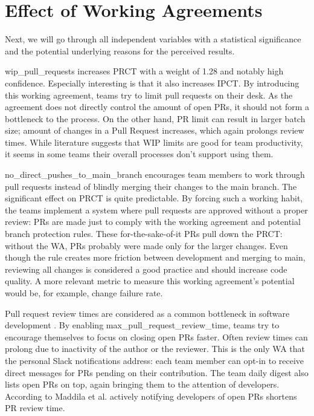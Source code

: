 \section{Effect of Working Agreements}

Next, we will go through all independent variables with a statistical significance and the potential underlying reasons for the perceived results.

wip\_pull\_requests increases PRCT with a weight of 1.28 and notably high confidence. Especially interesting is that it also increases IPCT. By introducing this working agreement, teams try to limit pull requests on their desk. As the agreement does not directly control the amount of open PRs, it should not form a bottleneck to the process. On the other hand, PR limit can result in larger batch size; amount of changes in a Pull Request increases, which again prolongs review times. While literature suggests that WIP limits are good for team productivity, it seems in some teams their overall processes don't support using them. 

no\_direct\_pushes\_to\_main\_branch encourages team members to work through pull requests instead of blindly merging their changes to the main branch. The significant effect on PRCT is quite predictable. By forcing such a working habit, the teams implement a system where pull requests are approved without a proper review: PRs are made just to comply with the working agreement and potential branch protection rules. These for-the-sake-of-it PRs pull down the PRCT: without the WA, PRs probably were made only for the larger changes. Even though the rule creates more friction between development and merging to main, reviewing all changes is considered a good practice and should increase code quality. A more relevant metric to measure this working agreement's potential would be, for example, change failure rate. 

Pull request review times are considered as a common bottleneck in software development \cite{maddila_nudge_2022}. By enabling max\_pull\_request\_review\_time, teams try to encourage themselves to focus on closing open PRs faster. Often review times can prolong due to inactivity of the author or the reviewer. This is the only WA that the personal Slack notifications address: each team member can opt-in to receive direct messages for PRs pending on their contribution. The team daily digest also lists open PRs on top, again bringing them to the attention of developers. According to Maddila et al. actively notifying developers of open PRs shortens PR review time.~\cite{maddila_nudge_2022}

